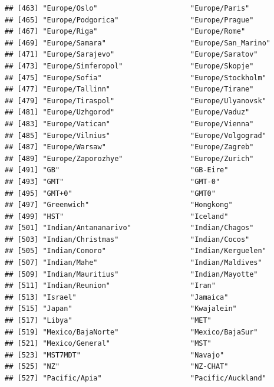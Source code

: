 \documentclass[
]{book}
\begin{document}
\begin{verbatim}
## [463] "Europe/Oslo"                      "Europe/Paris"                    
## [465] "Europe/Podgorica"                 "Europe/Prague"                   
## [467] "Europe/Riga"                      "Europe/Rome"                     
## [469] "Europe/Samara"                    "Europe/San_Marino"               
## [471] "Europe/Sarajevo"                  "Europe/Saratov"                  
## [473] "Europe/Simferopol"                "Europe/Skopje"                   
## [475] "Europe/Sofia"                     "Europe/Stockholm"                
## [477] "Europe/Tallinn"                   "Europe/Tirane"                   
## [479] "Europe/Tiraspol"                  "Europe/Ulyanovsk"                
## [481] "Europe/Uzhgorod"                  "Europe/Vaduz"                    
## [483] "Europe/Vatican"                   "Europe/Vienna"                   
## [485] "Europe/Vilnius"                   "Europe/Volgograd"                
## [487] "Europe/Warsaw"                    "Europe/Zagreb"                   
## [489] "Europe/Zaporozhye"                "Europe/Zurich"                   
## [491] "GB"                               "GB-Eire"                         
## [493] "GMT"                              "GMT-0"                           
## [495] "GMT+0"                            "GMT0"                            
## [497] "Greenwich"                        "Hongkong"                        
## [499] "HST"                              "Iceland"                         
## [501] "Indian/Antananarivo"              "Indian/Chagos"                   
## [503] "Indian/Christmas"                 "Indian/Cocos"                    
## [505] "Indian/Comoro"                    "Indian/Kerguelen"                
## [507] "Indian/Mahe"                      "Indian/Maldives"                 
## [509] "Indian/Mauritius"                 "Indian/Mayotte"                  
## [511] "Indian/Reunion"                   "Iran"                            
## [513] "Israel"                           "Jamaica"                         
## [515] "Japan"                            "Kwajalein"                       
## [517] "Libya"                            "MET"                             
## [519] "Mexico/BajaNorte"                 "Mexico/BajaSur"                  
## [521] "Mexico/General"                   "MST"                             
## [523] "MST7MDT"                          "Navajo"                          
## [525] "NZ"                               "NZ-CHAT"                         
## [527] "Pacific/Apia"                     "Pacific/Auckland"                

\end{verbatim}
\end{document}
